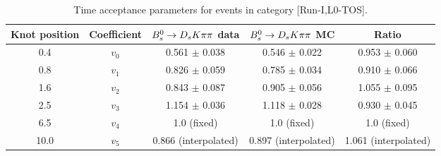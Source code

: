 \begin{table}[hp!]
\centering
\small
\caption{Time acceptance parameters for events in category [\textsf{Run-I},\textsf{L0-TOS}].}
\begin{tabular}{c c c c c}
\hline
\hline
Knot position & Coefficient & ${{B}^0_{s}}\rightarrow{\ensuremath{{D}_{s}}}{\ensuremath{K}}{\ensuremath{\pi}}{\ensuremath{\pi}}$ data & ${{B}^0_{s}}\rightarrow{\ensuremath{{D}_{s}}}{\ensuremath{K}}{\ensuremath{\pi}}{\ensuremath{\pi}}$ MC & Ratio \\
\hline
0.4 & $v_{0}$ & 0.561 $\pm$ 0.038 & 0.546 $\pm$ 0.022 & 0.953 $\pm$ 0.060\\
0.8 & $v_{1}$ & 0.826 $\pm$ 0.059 & 0.785 $\pm$ 0.034 & 0.910 $\pm$ 0.066\\
1.6 & $v_{2}$ & 0.843 $\pm$ 0.087 & 0.905 $\pm$ 0.056 & 1.055 $\pm$ 0.095\\
2.5 & $v_{3}$ & 1.154 $\pm$ 0.036 & 1.118 $\pm$ 0.028 & 0.930 $\pm$ 0.045\\
6.5 & $v_{4}$ &  1.0 (fixed) & 1.0 (fixed) & 1.0 (fixed)\\
10.0 & $v_{5}$ & 0.866 (interpolated) & 0.897 (interpolated) & 1.061 (interpolated) \\
\hline
\hline
\end{tabular}
\label{table:splines}
\end{table}